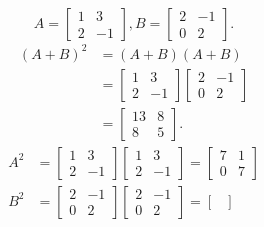 \documentclass{article}
\begin{document}
\begin{example}[Find $(A+B)^2$, $A^2+2AB+B^2$]
    \[
        A =
        \begin{bmatrix}
            1&3\\
            2&-1
        \end{bmatrix},
        B =
        \begin{bmatrix}
            2&-1\\
            0&2
        \end{bmatrix}
    .\] 
    \begin{align*}
        (A+B)^2 &= (A+B)(A+B)\\
                &= 
        \begin{bmatrix}
            1&3\\
            2&-1
        \end{bmatrix}
        \begin{bmatrix}
            2&-1\\
            0&2
        \end{bmatrix}\\
                &=
        \begin{bmatrix}
            13&8\\
            8&5
        \end{bmatrix}
    .\end{align*}
    \begin{align*}
        A^2 &=
        \begin{bmatrix}
            1&3\\
            2&-1
        \end{bmatrix}
        \begin{bmatrix}
            1&3\\
            2&-1
        \end{bmatrix}
        =
        \begin{bmatrix}
            7&1\\
            0&7
        \end{bmatrix}
        \\
        B^2 &=
        \begin{bmatrix}
            2&-1\\
            0&2
        \end{bmatrix}
        \begin{bmatrix}
            2&-1\\
            0&2
        \end{bmatrix}
        =
        \begin{bmatrix}

\end{bmatrix}
\end{align*}
\end{example}
\end{document}
